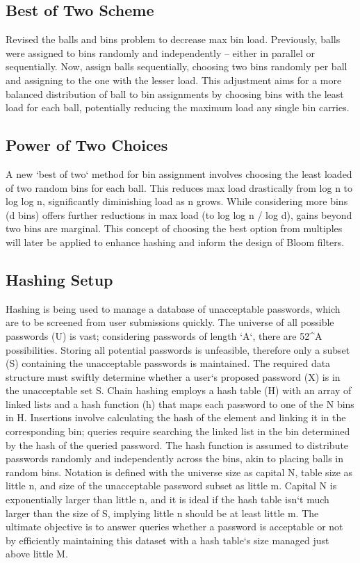 \subsection*{Best of Two Scheme}
Revised the balls and bins problem to decrease max bin load.
Previously, balls were assigned to bins randomly and independently -- either in parallel or sequentially.
Now, assign balls sequentially, choosing two bins randomly per ball and assigning to the one with the lesser load.
This adjustment aims for a more balanced distribution of ball to bin assignments by choosing bins with the least load for each ball, potentially reducing the maximum load any single bin carries.

\subsection*{Power of Two Choices}
A new `best of two` method for bin assignment involves choosing the least loaded of two random bins for each ball.
This reduces max load drastically from log n to log log n, significantly diminishing load as n grows.
While considering more bins (d bins) offers further reductions in max load (to log log n / log d), gains beyond two bins are marginal.
This concept of choosing the best option from multiples will later be applied to enhance hashing and inform the design of Bloom filters.

\subsection*{Hashing Setup}
Hashing is being used to manage a database of unacceptable passwords, which are to be screened from user submissions quickly.
The universe of all possible passwords (U) is vast; considering passwords of length `A`, there are 52\textasciicircum{}A possibilities.
Storing all potential passwords is unfeasible, therefore only a subset (S) containing the unacceptable passwords is maintained.
The required data structure must swiftly determine whether a user`s proposed password (X) is in the unacceptable set S\@.
Chain hashing employs a hash table (H) with an array of linked lists and a hash function (h) that maps each password to one of the N bins in H\@.
Insertions involve calculating the hash of the element and linking it in the corresponding bin; queries require searching the linked list in the bin determined by the hash of the queried password.
The hash function is assumed to distribute passwords randomly and independently across the bins, akin to placing balls in random bins.
Notation is defined with the universe size as capital N, table size as little n, and size of the unacceptable password subset as little m.
Capital N is exponentially larger than little n, and it is ideal if the hash table isn`t much larger than the size of S, implying little n should be at least little m.
The ultimate objective is to answer queries whether a password is acceptable or not by efficiently maintaining this dataset with a hash table`s size managed just above little M\@.

